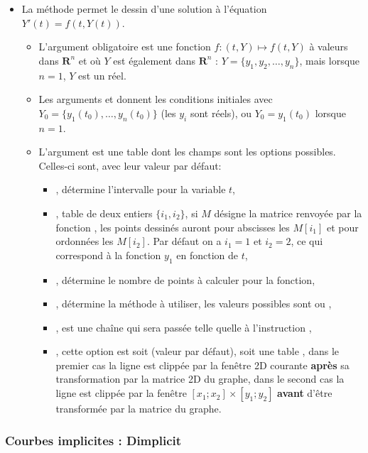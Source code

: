 \begin{itemize}
\item La méthode  permet le dessin d'une solution à l'équation \(Y'(t)=f(t,Y(t))\).
  \begin{itemize}
  \item L'argument obligatoire  est une fonction \(f\colon (t,Y) \mapsto f(t,Y)\) à valeurs dans \(\mathbf R^n\) et où $Y$ est également dans \(\mathbf R^n\) : $Y=\{y_1,y_2,\ldots,y_n\}$,  mais lorsque $n=1$, $Y$ est un réel.
  \item Les arguments  et  donnent les conditions initiales avec $Y_0=\{y_1(t_0),\ldots,y_n(t_0)\}$ (les $y_i$ sont réels), ou $Y_0=y_1(t_0)$ lorsque $n=1$.
  \item L'argument  est une table dont les champs sont les options possibles. Celles-ci sont, avec leur valeur par défaut:
      \begin{itemize}
        \item {}, détermine l'intervalle pour la variable $t$,
        \item {},  table de deux entiers $\{i_1,i_2\}$, si $M$ désigne la matrice renvoyée par la fonction , les points dessinés auront pour abscisses les $M[i_1]$ et pour ordonnées les $M[i_2]$. Par défaut on a $i_1=1$ et $i_2=2$, ce qui correspond à la fonction $y_1$ en fonction de $t$,
        \item {}, détermine le nombre de points à calculer pour la fonction,
        \item {}, détermine la méthode à utiliser, les valeurs possibles sont  ou ,
        \item {}, est une chaîne qui sera passée telle quelle à l'instruction \drawcmd,
      \item {}, cette option est soit \nil (valeur par défaut), soit une table , dans le premier cas la ligne est clippée par la fenêtre 2D courante \textbf{après} sa transformation par la matrice 2D du graphe, dans le second cas la ligne est clippée par la fenêtre $[x_1;x_2]\times[y_1;y_2]$ \textbf{avant} d'être transformée par la matrice du graphe.
      \end{itemize}
  \end{itemize}
\end{itemize}

\subsubsection{Courbes implicites : Dimplicit}

